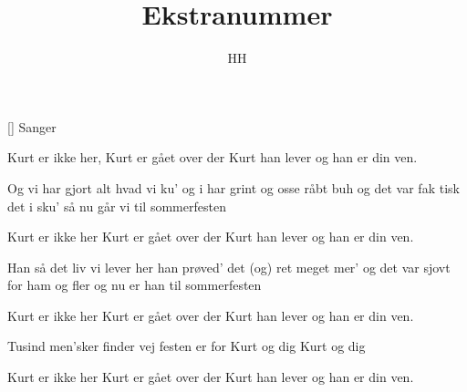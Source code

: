 \documentclass[a4paper,11pt]{article}
\title{Ekstranummer}
\author{HH}
\begin{document}
\maketitle

\begin{roles}
[] Sanger
\end{roles}

\begin{song}

     Kurt er ikke her,
              Kurt er gået over der 
              Kurt han lever 
              og han er din ven.

     Og vi har gjort
              alt hvad vi ku'
              og i har grint
              og osse råbt buh
              og det var fak\-
              tisk det i sku'
              så nu går vi
              til sommerfesten

     Kurt er ikke her
              Kurt er gået over der
              Kurt han lever
              og han er din ven.

     Han så det liv
              vi lever her
              han prøved' det
              (og) ret meget mer'
              og det var sjovt
              for ham og fler
              og nu er han
              til sommerfesten

     Kurt er ikke her
              Kurt er gået over der
              Kurt han lever
              og han er din ven.

     Tusind men'sker finder vej
              festen er for Kurt og dig
              Kurt og dig

     Kurt er ikke her
              Kurt er gået over der
              Kurt han lever
              og han er din ven.
\end{song}
\end{document}
